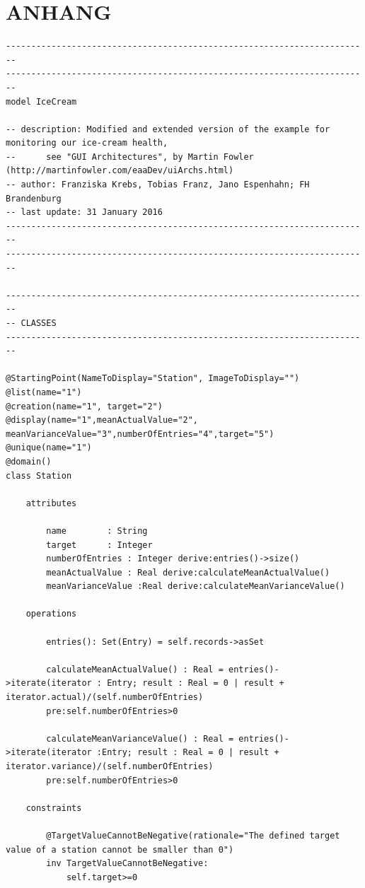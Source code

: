 \documentclass[a4paper,twoside]{article}
\begin{document}
\section*{\uppercase{Anhang}}
\begin{lstlisting}[caption={Vollständige USE-Spezifikation des IceCream Modells},label=lst:completeUSE]
------------------------------------------------------------------------
------------------------------------------------------------------------
model IceCream

-- description: Modified and extended version of the example for monitoring our ice-cream health,
-- 		see "GUI Architectures", by Martin Fowler (http://martinfowler.com/eaaDev/uiArchs.html)
-- author: Franziska Krebs, Tobias Franz, Jano Espenhahn; FH Brandenburg
-- last update: 31 January 2016
------------------------------------------------------------------------
------------------------------------------------------------------------

------------------------------------------------------------------------
-- CLASSES
------------------------------------------------------------------------

@StartingPoint(NameToDisplay="Station", ImageToDisplay="")
@list(name="1")
@creation(name="1", target="2")
@display(name="1",meanActualValue="2", meanVarianceValue="3",numberOfEntries="4",target="5")
@unique(name="1")
@domain()
class Station

	attributes

		name		: String
		target		: Integer
		numberOfEntries : Integer derive:entries()->size()
		meanActualValue : Real derive:calculateMeanActualValue()
		meanVarianceValue :Real derive:calculateMeanVarianceValue()
		
	operations
	
		entries(): Set(Entry) = self.records->asSet
	  
		calculateMeanActualValue() : Real = entries()->iterate(iterator : Entry; result : Real = 0 | result + iterator.actual)/(self.numberOfEntries) 
		pre:self.numberOfEntries>0

		calculateMeanVarianceValue() : Real = entries()->iterate(iterator :Entry; result : Real = 0 | result + iterator.variance)/(self.numberOfEntries) 
		pre:self.numberOfEntries>0
		
	constraints
	
		@TargetValueCannotBeNegative(rationale="The defined target value of a station cannot be smaller than 0")
		inv TargetValueCannotBeNegative:
			self.target>=0
		

\end{lstlisting}
\end{document}
